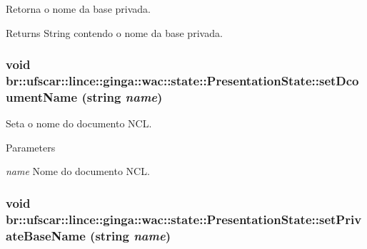 Retorna o nome da base privada. \begin{DoxyReturn}{Returns}
String contendo o nome da base privada. 
\end{DoxyReturn}
\hypertarget{classbr_1_1ufscar_1_1lince_1_1ginga_1_1wac_1_1state_1_1PresentationState_aadc7632e1bff7b0c2680a5193679e1d9}{
\subsubsection[{setDcoumentName}]{\setlength{\rightskip}{0pt plus 5cm}void br::ufscar::lince::ginga::wac::state::PresentationState::setDcoumentName (string {\em name})}}
\label{classbr_1_1ufscar_1_1lince_1_1ginga_1_1wac_1_1state_1_1PresentationState_aadc7632e1bff7b0c2680a5193679e1d9}


Seta o nome do documento NCL. 
\begin{DoxyParams}{Parameters}
\item[{\em name}]Nome do documento NCL. \end{DoxyParams}
\hypertarget{classbr_1_1ufscar_1_1lince_1_1ginga_1_1wac_1_1state_1_1PresentationState_a127842284622579c23ec1d6ce974fe8f}{
\subsubsection[{setPrivateBaseName}]{\setlength{\rightskip}{0pt plus 5cm}void br::ufscar::lince::ginga::wac::state::PresentationState::setPrivateBaseName (string {\em name})}}
\label{classbr_1_1ufscar_1_1lince_1_1ginga_1_1wac_1_1state_1_1PresentationState_a127842284622579c23ec1d6ce974fe8f}


